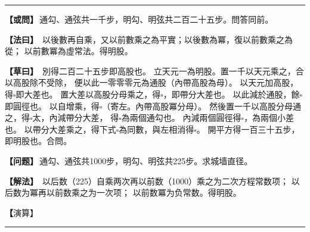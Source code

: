 \documentclass[11pt,a4paper]{article}
\let\origsquare\square
\renewcommand{\square}{\ensuremath{\origsquare}}%
\newcommand{\longline}{\noindent\rule{\textwidth}{0.4pt}}
\newcommand{\clOWEN}[1]{%
  \par\vspace{0.3em}%
  \noindent\textcolor{problemcolor}{\textbf{【或問】}}\,{\tradfont #1}\par\nopagebreak%
}
\newcommand{\mdOWEN}[1]{%
  \par\vspace{0.3em}%
  \noindent\textcolor{problemcolor}{\textbf{【问题】}}\,{\modfont #1}\par\nopagebreak%
}
\newcommand{\clFAYUE}[1]{%
  \par\noindent\textcolor{methodcolor}{\textbf{【法曰】}}\,{\tradfont #1}\par\nopagebreak%
}
\newcommand{\mdFAYUE}[1]{%
  \par\noindent\textcolor{methodcolor}{\textbf{【解法】}}\,{\modfont #1}\par\nopagebreak%
}
\newcommand{\clTSAOYUE}[1]{%
  \par\noindent\textcolor{workcolor}{\textbf{【草曰】}}\,{\tradfont #1}\par%
}
\newcommand{\mdTSAOYUE}[1]{%
  \par\noindent\textcolor{workcolor}{\textbf【演算】}}\,{\modfont #1}\par%
\begin{document}
\vspace{0.3cm}
\begin{center}\longline\end{center}

\begin{paracol}{2}

\begin{leftcolumn}
\clOWEN{通勾、通弦共一千步，明勾、明弦共二百二十五步。問答同前。}

\clFAYUE{%
以後數再自乘，又以前數乘之為平實；以後數為冪，復以前數乘之為從；
以前數冪為虛常法。得明股。}

\clTSAOYUE{%
別得二百二十五步即高股也。
立天元一為明股。置一千以天元乘之，合以高股除不受除，
便以此一零零零元為通股（內帶高股為母）。
以天元加高股，得$\square$即大差也。
置大差以高股分母乘之，得$\square$，即帶分大差也。
以此減於通股，餘$\square$即圓徑也。
以自增乘，得$\square$（寄左。內帶高股冪分母）。
然後置一千以高股分母通之，得$\square$太，內減帶分大差，
得$\square$為兩個通勾也。
內減兩個圓徑得$\square$，為兩個小差也。
以帶分大差乘之，得下式$\square$為同數，與左相消得$\square$。
開平方得一百三十五步，即明股也。合問。}
\end{leftcolumn}

\switchcolumn

\begin{rightcolumn}
\mdOWEN{通勾、通弦共1000步，明勾、明弦共225步。求城墙直径。}

\mdFAYUE{%
以后数（225）自乘两次再以前数（1000）乘之为二次方程常数项；
以后数为冪再以前数乘之为一次项；
以前数冪为负常数。得明股。}

\mdTSAOYUE{%
辨识得：225步即高股。
设天元一为明股。取1000以天元乘之，应以高股除，不除，
便以此1000元为通股（内带高股为分母）。
以天元加高股得$\square$即大差。
取大差以高股分母乘之，得$\square$即带分大差。
以此减于通股，余$\square$即圆径。
自乘得$\square$（寄左。内带高股冪分母）。
然后取1000以高股分母通之，得$\square$太，内减带分大差，
得$\square$为两个通勾。
内减两个圆径得$\square$为两个小差。
以带分大差乘之，得下式$\square$为同数，与左式相消得$\square$。
开平方得135步，即明股。符合所问。}
\end{rightcolumn}

\end{paracol}

\vspace{0.3cm}
\begin{center}\longline\end{center}
\end{document}
